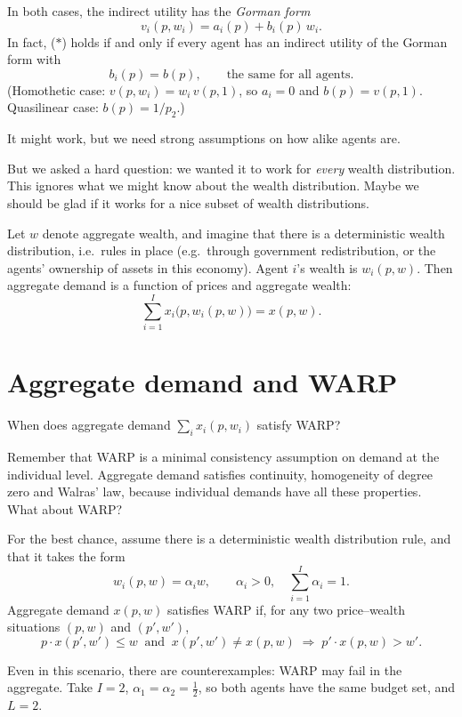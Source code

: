 \documentclass[11pt]{article}
\begin{document}
In both cases, the indirect utility has the \emph{Gorman form}
\[ v_i(p,w_i)=a_i(p)+b_i(p)\,w_i. \]
In fact, ($*$) holds if and only if every agent has an indirect utility of the
Gorman form with
\[ b_i(p)=b(p),\qquad\text{the same for all agents.} \]
(Homothetic case: $v(p,w_i)=w_i\,v(p,1)$, so $a_i=0$ and $b(p)=v(p,1)$.
Quasilinear case: $b(p)=1/p_2$.)

It might work, but we need strong assumptions on how alike agents are.

But we asked a hard question: we wanted it to work for \emph{every} wealth
distribution. This ignores what we might know about the wealth distribution.
Maybe we should be glad if it works for a nice subset of wealth distributions.

Let $w$ denote aggregate wealth, and imagine that there is a deterministic wealth
distribution, i.e.\ rules in place (e.g.\ through government redistribution, or
the agents' ownership of assets in this economy). Agent $i$'s wealth is
$w_i(p,w)$. Then aggregate demand is a function of prices and aggregate wealth:
\[ \sum_{i=1}^{I}x_i\bigl(p,w_i(p,w)\bigr)=x(p,w). \]

\section{Aggregate demand and WARP}

When does aggregate demand $\sum_i x_i(p,w_i)$ satisfy WARP?

Remember that WARP is a minimal consistency assumption on demand at the
individual level. Aggregate demand satisfies continuity, homogeneity of degree
zero and Walras' law, because individual demands have all these properties.
What about WARP?

For the best chance, assume there is a deterministic wealth distribution rule,
and that it takes the form
\[ w_i(p,w)=\alpha_i w,\qquad \alpha_i>0,\quad \sum_{i=1}^{I}\alpha_i=1. \]
Aggregate demand $x(p,w)$ satisfies WARP if, for any two price--wealth
situations $(p,w)$ and $(p',w')$,
\[ p\cdot x(p',w')\le w\ \text{ and }\ x(p',w')\ne x(p,w)
   \;\Longrightarrow\; p'\cdot x(p,w)>w'. \]

Even in this scenario, there are counterexamples: WARP may fail in the
aggregate. Take $I=2$, $\alpha_1=\alpha_2=\tfrac12$, so both agents have the same
budget set, and $L=2$.
\end{document}

